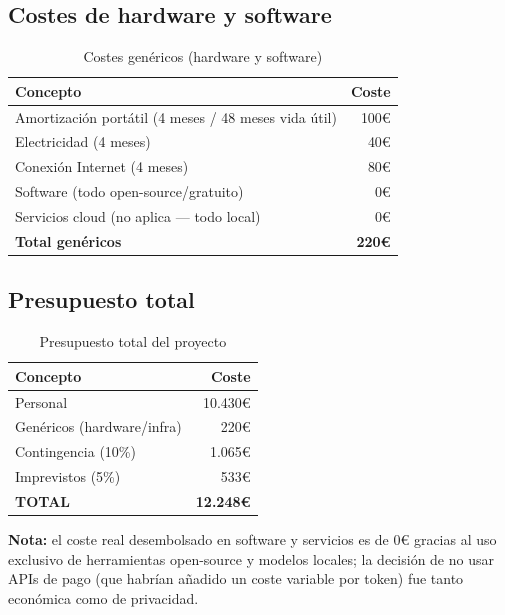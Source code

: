 \documentclass[12pt, a4paper, twoside]{report}
\begin{document}
\subsection{Costes de hardware y software}

\begin{table}[H]
\centering
\caption{Costes gen\'ericos (hardware y software)}
\label{tab:costes-genericos}
\begin{tabular}{lr}
\toprule
\textbf{Concepto} & \textbf{Coste} \\
\midrule
Amortizaci\'on port\'atil (4 meses / 48 meses vida \'util) & 100\euro \\
Electricidad (4 meses) & 40\euro \\
Conexi\'on Internet (4 meses) & 80\euro \\
Software (todo open-source/gratuito) & 0\euro \\
Servicios cloud (no aplica --- todo local) & 0\euro \\
\midrule
\textbf{Total gen\'ericos} & \textbf{220\euro} \\
\bottomrule
\end{tabular}
\end{table}

\subsection{Presupuesto total}

\begin{table}[H]
\centering
\caption{Presupuesto total del proyecto}
\label{tab:presupuesto-total}
\begin{tabular}{lr}
\toprule
\textbf{Concepto} & \textbf{Coste} \\
\midrule
Personal & 10.430\euro \\
Gen\'ericos (hardware/infra) & 220\euro \\
Contingencia (10\%) & 1.065\euro \\
Imprevistos (5\%) & 533\euro \\
\midrule
\textbf{TOTAL} & \textbf{12.248\euro} \\
\bottomrule
\end{tabular}
\end{table}

\textbf{Nota:} el coste real desembolsado en software y servicios es de 0\euro{} gracias al uso exclusivo de herramientas open-source y modelos locales; la decisi\'on de no usar APIs de pago (que habr\'ian a\~nadido un coste variable por token) fue tanto econ\'omica como de privacidad.
\end{document}
